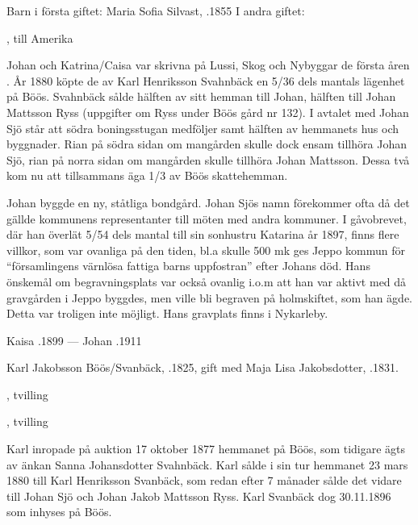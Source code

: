 Barn i första giftet: Maria Sofia Silvast, .1855
I andra giftet:
\begin{jhchildren}
  \item {}
  \item {}, till Amerika
  \item {}
\end{jhchildren}
Johan och Katrina/Caisa var skrivna på Lussi, Skog och Nybyggar de första åren . År 1880 köpte de av Karl Henriksson Svahnbäck en 5/36 dels mantals lägenhet på Böös. Svahnbäck sålde hälften av sitt hemman till Johan, hälften till Johan Mattsson Ryss (uppgifter om Ryss under Böös gård nr 132). I avtalet med Johan Sjö står att södra boningsstugan medföljer samt hälften av hemmanets hus och byggnader. Rian på södra sidan om mangården skulle dock ensam tillhöra Johan Sjö, rian på norra sidan om mangården skulle tillhöra Johan Mattsson. Dessa två kom nu att tillsammans äga 1/3 av Böös skattehemman.

Johan byggde en ny, ståtliga bondgård. Johan Sjös namn förekommer ofta då det gällde kommunens representanter till möten med andra kommuner. I gåvobrevet, där han överlät 5/54 dels mantal till sin sonhustru Katarina år 1897, finns flere villkor, som var ovanliga på den tiden, bl.a skulle 500 mk ges Jeppo kommun för ``församlingens värnlösa fattiga barns uppfostran'' efter Johans död. Hans önskemål om begravningsplats var också ovanlig i.o.m att han var aktivt med då gravgården i Jeppo byggdes, men ville bli begraven på holmskiftet, som han ägde. Detta var troligen inte möjligt. Hans gravplats finns i Nykarleby.

Kaisa .1899  ---  Johan .1911


Karl Jakobsson Böös/Svanbäck, .1825, gift med Maja Lisa Jakobsdotter, .1831.
\begin{jhchildren}
  \item {}, tvilling
  \item {}, tvilling
  \item {}
  \item {}
  \item {}
\end{jhchildren}
Karl inropade på auktion 17 oktober 1877 hemmanet på Böös, som tidigare ägts av änkan Sanna Johansdotter Svahnbäck. Karl sålde i sin tur hemmanet 23 mars 1880 till Karl Henriksson Svanbäck, som redan efter 7 månader sålde det vidare till Johan Sjö och Johan Jakob Mattsson Ryss. Karl Svanbäck dog 30.11.1896 som inhyses på Böös.


